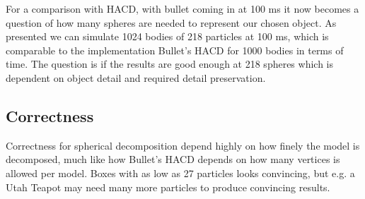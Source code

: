 For a comparison with HACD, with bullet coming in at 100 ms it now becomes
a question of how many spheres are needed to represent our chosen object.
As presented we can simulate 1024 bodies of 218 particles at 100 ms, which is comparable to
 the implementation Bullet's HACD for 1000 bodies in terms of time. The question is
 if the results are good enough at 218 spheres which is dependent on object detail
 and required detail preservation.

\subsection{Correctness}
Correctness for spherical decomposition depend highly on how finely the model is
decomposed, much like how Bullet's HACD depends on how many vertices is allowed
per model. Boxes with as low as 27 particles looks convincing, but e.g. a Utah Teapot
may need many more particles to produce convincing results.
